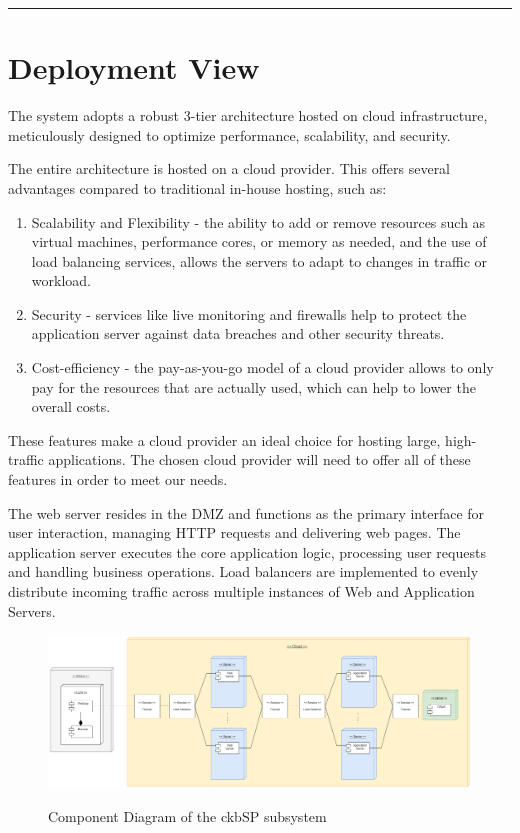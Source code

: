 \documentclass{Configuration_Files/Template}
\begin{document}
{\color{bluepoli}\rule{\linewidth}{0.1pt}}

\section{Deployment View}

The system adopts a robust 3-tier architecture hosted on cloud infrastructure, meticulously designed to optimize performance, scalability, and security.

The entire architecture is hosted on a cloud provider. This offers several advantages compared to traditional in-house hosting, such as:
\begin{enumerate}
    \item Scalability and Flexibility - the ability to add or remove resources such as virtual machines, performance cores, or memory as needed, and the use of load balancing services, allows the servers to adapt to changes in traffic or workload.
    \item Security - services like live monitoring and firewalls help to protect the application server against data breaches and other security threats.
    \item Cost-efficiency - the pay-as-you-go model of a cloud provider allows to only pay for the resources that are actually used, which can help to lower the overall costs.
\end{enumerate}
These features make a cloud provider an ideal choice for hosting large, high-traffic applications. The chosen cloud provider will need to offer all of these features in order to meet our needs.

The web server resides in the DMZ and functions as the primary interface for user interaction, managing HTTP requests and delivering web pages. The application server executes the core application logic, processing user requests and handling business operations. Load balancers are implemented to evenly distribute incoming traffic across multiple instances of Web and Application Servers.

\begin{figure}[H]
\centering
\includegraphics[scale = 0.4]{Images/diagrams/Deployment_view.png}\\
\caption{Component Diagram of the ckbSP subsystem}
\end{figure}
\end{document}
